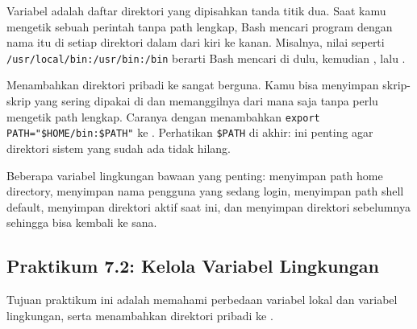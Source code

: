 Variabel  adalah daftar direktori yang dipisahkan tanda titik
dua. Saat kamu mengetik sebuah perintah tanpa path lengkap, Bash mencari
program dengan nama itu di setiap direktori dalam  dari kiri ke
kanan. Misalnya, nilai  seperti
\texttt{/usr/local/bin:/usr/bin:/bin} berarti Bash mencari di
 dulu, kemudian , lalu .

Menambahkan direktori pribadi ke  sangat berguna. Kamu bisa
menyimpan skrip-skrip yang sering dipakai di  dan memanggilnya
dari mana saja tanpa perlu mengetik path lengkap. Caranya dengan menambahkan
\texttt{export PATH="\$HOME/bin:\$PATH"} ke . Perhatikan
\texttt{\$PATH} di akhir: ini penting agar direktori sistem yang sudah ada
tidak hilang.

Beberapa variabel lingkungan bawaan yang penting:  menyimpan path
home directory,  menyimpan nama pengguna yang sedang login,
 menyimpan path shell default,  menyimpan direktori
aktif saat ini, dan  menyimpan direktori sebelumnya sehingga
 bisa kembali ke sana.

\subsection*{Praktikum 7.2: Kelola Variabel Lingkungan}

Tujuan praktikum ini adalah memahami perbedaan variabel lokal dan
variabel lingkungan, serta menambahkan direktori pribadi ke .

